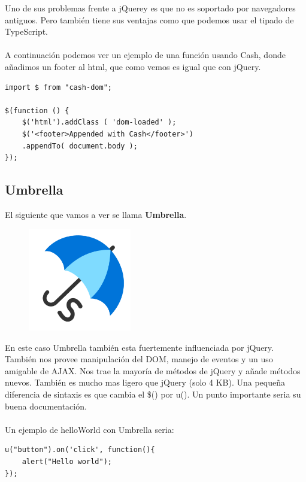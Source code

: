 \documentclass[12pt,a4paper]{article}
\begin{document}
Uno de sus problemas frente a jQuerey es que no es soportado por navegadores antiguos. Pero también tiene sus ventajas como que podemos usar el tipado de TypeScript. \\
\\
A continuación podemos ver un ejemplo de una función usando Cash, donde añadimos un footer al html, que como vemos es igual que con jQuery. 

\begin{lstlisting}[frame=single]  % Inicia el bloque de código
import $ from "cash-dom";

$(function () {
	$('html').addClass ( 'dom-loaded' );
	$('<footer>Appended with Cash</footer>')
	.appendTo( document.body );
});
\end{lstlisting}
\subsection{Umbrella}
El siguiente que vamos a ver se llama \textbf{Umbrella}.
\begin{figure}[H]
	\centering
	\includegraphics[width=0.4\textwidth]{images/umbrella.png}
\end{figure}
En este caso Umbrella también esta fuertemente influenciada por jQuery. También nos provee manipulación del DOM, manejo de eventos y un uso amigable de AJAX. Nos trae la mayoría de métodos de jQuery y añade métodos nuevos. También es mucho mas ligero que jQuery (solo 4 KB). Una pequeña diferencia de sintaxis es que cambia el \$() por  u(). Un punto importante seria su buena documentación.
\\
\\
Un ejemplo de helloWorld con Umbrella seria:
\begin{lstlisting}[frame=single]
u("button").on('click', function(){
	alert("Hello world");
});
\end{lstlisting}
\end{document}
